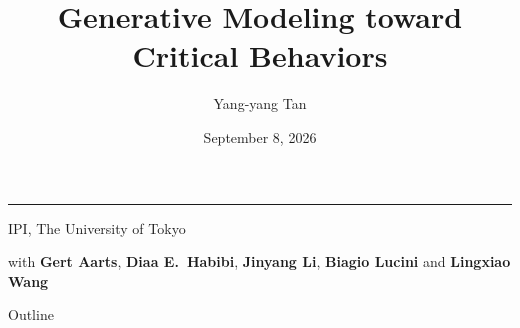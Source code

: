 \documentclass[11pt,t]{beamer}
\title{Generative Modeling toward\\ Critical Behaviors}
\subtitle{}
\date{September 8, 2026}
\author{Yang-yang Tan}
\begin{document}
\begin{frame}
  \inserttitlegraphic\par
  \vspace*{0.5cm}
  {\LARGE\bfseries \inserttitle\par}
  \vspace{0.4em}
  {\color{orange}\rule{\textwidth}{0.4pt}\par}
  \vspace{1.4em}
  {\normalsize\bfseries \insertauthor\par}
  \vspace{0.6em}
  {\small IPI, The University of Tokyo\par}
  \vspace{0.4em}
  {\small with \textbf{Gert Aarts}, \textbf{Diaa E.\ Habibi}, \textbf{Jinyang Li}, \textbf{Biagio Lucini} and \textbf{Lingxiao Wang}\par}
  \vspace{0.3em}
  {\normalsize \insertdate\par}
\end{frame}

\begin{frame}{Outline}
  \tableofcontents
\end{frame}

\end{document}
